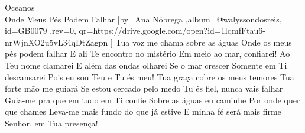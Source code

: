 \beginsong
{Oceanos \\ Onde Meus Pés Podem Falhar %
}[by={Ana Nóbrega %
},album={@walyssondosreis},
id={GB0079 %
},rev={0}, %
qr={https://drive.google.com/open?id=1lqmfFtau6-nrWjnXO2u5vL34qDtZagpn %
}]
\beginverse*
Tua voz me chama sobre as águas
Onde os meus pés podem falhar
E ali Te encontro no mistério
Em meio ao mar, confiarei!
\endverse
\beginchorus
Ao Teu nome clamarei
E além das ondas olharei
Se o mar crescer
Somente em Ti descansarei
Pois eu sou Teu e Tu és meu!
\endchorus
\beginverse*
Tua graça cobre os meus temores
Tua forte mão me guiará
Se estou cercado pelo medo
Tu és fiel, nunca vais falhar
\endverse
\beginverse*
Guia-me pra que em tudo em Ti confie
Sobre as águas eu caminhe
Por onde quer que chames
Leva-me mais fundo do que já estive
E minha fé será mais firme
Senhor, em Tua presença!
\endverse
\vspace{4em} %
\begin{comment}
\lstset{basicstyle=\scriptsize\bf} %
\tab{Solo 1}
\begin{lstlisting}
E|-----------------------------------------------------|
B|-----------------------------------------------------|
G|-----------------------------------------------------|
D|-----------------------------------------------------|
A|-----------------------------------------------------|
E|-----------------------------------------------------|
\end{lstlisting}
\end{comment}
 
